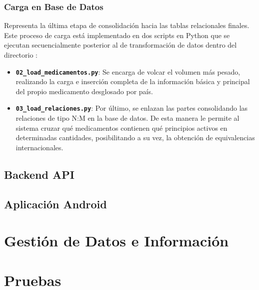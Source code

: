 \documentclass[12pt, a4paper]{report}
\begin{document}
\subsection{Carga en Base de Datos}
Representa la última etapa de consolidación hacia las tablas relacionales finales. Este proceso de carga está implementado en dos scripts en Python que se ejecutan secuencialmente posterior al de transformación de datos dentro del directorio \textit{}:

\begin{itemize}
    \item \textbf{\texttt{02\_load\_medicamentos.py}}: Se encarga de volcar el volumen más pesado, realizando la carga e inserción completa de la información básica y principal del propio medicamento desglosado por país.

    \item \textbf{\texttt{03\_load\_relaciones.py}}: Por último, se enlazan las partes consolidando las relaciones de tipo N:M en la base de datos. De esta manera le permite al sistema cruzar qué medicamentos contienen qué principios activos en determinadas cantidades, posibilitando a su vez, la obtención de equivalencias internacionales.
\end{itemize}

\section{Backend API}
\section{Aplicación Android}

\newpage

\chapter{Gestión de Datos e Información}
\newpage

\chapter{Pruebas}
\newpage
\end{document}
